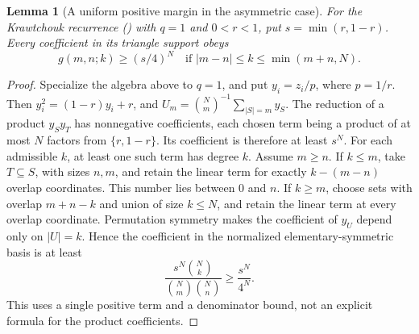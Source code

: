 \documentclass[twoside,10pt]{article}
\numberwithin{equation}{section}
\theoremstyle{slbody}
\newtheorem{lemma}[theorem]{Lemma}
\theoremstyle{definition}
\theoremstyle{remark}
\renewcommand{\eqref}[1]{\textup{{\normalfont(\oldstylenums{\ref{#1}}}\normalfont)}}
\begin{document}
\begin{lemma}[A uniform positive margin in the asymmetric case]\label{lem:margin}
For the Krawtchouk recurrence \eqref{eq:parameters} with $q=1$ and $0<r<1$, put $s=\min(r,1-r)$. Every coefficient in its triangle support obeys
\begin{equation}\label{eq:margin}
g(m,n;k)\geq (s/4)^N\quad\text{if }|m-n|\leq k\leq\min(m+n,N).
\end{equation}
\end{lemma}
\begin{proof}
Specialize the algebra above to $q=1$, and put $y_i=z_i/p$, where $p=1/r$. Then $y_i^2=(1-r)y_i+r$, and $U_m=\binom Nm^{-1}\sum_{|S|=m}y_S$. The reduction of a product $y_Sy_T$ has nonnegative coefficients, each chosen term being a product of at most $N$ factors from $\{r,1-r\}$. Its coefficient is therefore at least $s^N$.
For each admissible $k$, at least one such term has degree $k$. Assume $m\geq n$. If $k\leq m$, take $T\subseteq S$, with sizes $n,m$, and retain the linear term for exactly $k-(m-n)$ overlap coordinates. This number lies between $0$ and $n$. If $k\geq m$, choose sets with overlap $m+n-k$ and union of size $k\leq N$, and retain the linear term at every overlap coordinate.
Permutation symmetry makes the coefficient of $y_U$ depend only on $|U|=k$. Hence the coefficient in the normalized elementary-symmetric basis is at least
\[
\frac{s^N\binom Nk}{\binom Nm\binom Nn}\geq\frac{s^N}{4^N}.
\]
This uses a single positive term and a denominator bound, not an explicit formula for the product coefficients.
\end{proof}
\end{document}
